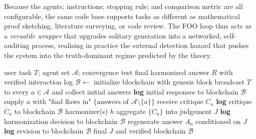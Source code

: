 \documentclass[12pt]{article}
\theoremstyle{definition}
\begin{document}
Because the agents; instructions; stopping rule; and comparison metric
are all configurable, the same code base supports tasks as different as
mathematical proof sketching, literature surveying, or code review.  The
FOO loop thus acts as a \emph{versatile wrapper} that upgrades solitary
generation into a networked, self-auditing process, realising in
practice the external detection hazard that pushes the system into the
truth-dominant regime predicted by the theory.


\begin{algorithm}
\caption{FOO with integrity logging}
\label{algo:foo-blockchain}
\begin{algorithmic}[1]
\Require user task $T$; agent set $\mathcal{A}$; convergence test
\Ensure final harmonized answer $R$ with verified interaction log
\State $\mathcal{B} \gets$ initialize blockchain with genesis block
\State broadcast $T$ to every $a\in\mathcal{A}$ and collect initial answers
\State \textbf{log} initial responses to blockchain $\mathcal{B}$
\Repeat
        \State supply $a$ with "find flaws in" $\{\text{answers of } \mathcal{A}\setminus\{a\}\}$
        \State receive critique $C_{a}$
        \State \textbf{log} critique $C_a$ to blockchain $\mathcal{B}$
    \EndFor
    \State harmonizer(s) $h$ aggregate $\{C_{a}\}$ into judgement $J$
    \State \textbf{log} harmonization decision to blockchain $\mathcal{B}$
        \State regenerate answer $A_{a}$ conditioned on $J$
        \State \textbf{log} revision to blockchain $\mathcal{B}$
    \EndFor
{}
\State \Return final $J$ and verified blockchain $\mathcal{B}$
\end{algorithmic}
\end{algorithm}

\end{document}
